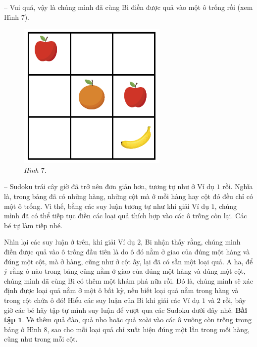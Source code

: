 	\begin{multicols}{2}
	-- Vui quá, vậy là chúng mình đã cùng Bi điền được quả vào một ô trống rồi (xem Hình $7$).
		\begin{figure}[H]
		\vspace*{-5pt}
		\centering
		\captionsetup{labelformat=empty, justification=centering}
		\includegraphics[scale=0.4]{hinh7}
		\caption{\textit{\small Hình $7.$}}
		\vspace*{-5pt}
		\end{figure}
		-- Sudoku trái cây giờ đã trở nên đơn giản hơn, tương tự như ở Ví dụ $1$ rồi. Nghĩa là, trong bảng đã có những hàng, những cột mà ở mỗi hàng hay cột đó đều chỉ có một ô trống. Vì thế, bằng các suy luận tương tự như khi giải Ví dụ $1$, chúng mình đã có thể tiếp tục điền các loại quả thích hợp vào các ô trống còn lại. Các bé tự làm tiếp nhé.
	\end{multicols}
	\vskip 0.1cm
	Nhìn lại các suy luận ở trên, khi giải Ví dụ $2$, Bi nhận thấy rằng, chúng mình điền được quả vào ô trống đầu tiên là do ô đó nằm ở giao của đúng một hàng và đúng một cột, mà ở hàng, cũng như ở cột ấy, lại đã có sẵn một loại quả. A ha, để ý rằng ô nào trong bảng cũng nằm ở giao của đúng một hàng và đúng một cột, chúng mình đã cùng Bi có thêm một khám phá nữa rồi. Đó là, chúng mình sẽ xác định được loại quả nằm ở một ô bất kỳ, nếu biết loại quả nằm trong hàng và trong cột chứa ô đó!
	\vskip 0.1cm
	Hiểu các suy luận của Bi khi giải các Ví dụ $1$ và $2$ rồi, bây giờ các bé hãy tập tự mình suy luận để vượt qua các Sudoku dưới đây nhé.
	\vskip 0.1cm
	\textbf{\color{toancuabi}Bài tập $\pmb{1.}$} Vẽ thêm quả đào, quả nho hoặc quả xoài vào các ô vuông còn trống trong bảng ở Hình $8$, sao cho mỗi loại quả chỉ xuất hiện đúng một lần trong mỗi hàng, cũng như trong mỗi cột.
	\vskip 0.3cm
